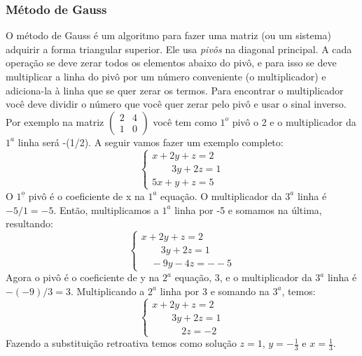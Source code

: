   \subsubsection*{Método de Gauss}
  O método de Gauss é um algoritmo para fazer uma matriz (ou um sistema) adquirir a forma triangular superior. Ele usa \textit{pivôs} na diagonal principal. A cada operação se deve zerar todos os elementos abaixo do pivô, e para isso se deve multiplicar a linha do pivô por um número conveniente (o multiplicador) e adiciona-la à linha que se quer zerar os termos. Para encontrar o multiplicador você deve dividir o número que você quer zerar pelo pivô e usar o sinal inverso.\\
  Por exemplo na matriz $\left(\begin{smallmatrix}2&4\\1&0\end{smallmatrix}\right)$ você tem como $1^o$ pivô o 2 e o multiplicador da $1^a$ linha será -(1/2). A seguir vamos fazer um exemplo completo:
  \[\left\{
    \begin{array}{l}
    x+2y+z=2\\
    \qquad 3y+2z=1\\
    5x+y+z=5
    \end{array}\right.\]
    O $ 1^{\underline{o}} $ pivô é o coeficiente de x na $1^a$ equação. O multiplicador da $3^a$ linha é $-5/1=-5$.
Então, multiplicamos a $1^a$ linha por -5 e somamos na última, resultando:
    \[\left\{
    \begin{array}{l}
    x+2y+z=2\\
    \qquad 3y+2z=1\\
    \quad -9y-4z =--5  
    \end{array}\right.\]
    Agora o pivô é o coeficiente de y na $2^a$ equação, 3, e o multiplicador da $3^a$ linha é $-(-9)/3=3$.
Multiplicando a $2^a$ linha por 3 e somando na $3^a$, temos:
    \[\left\{
    \begin{array}{l}
    x+2y+z=2\\
    \qquad 3y+2z=1\\
    \qquad\quad 2z =-2  
    \end{array}\right.\]
    Fazendo a substituição retroativa temos como solução $z=1$, $y= -\frac{1}{3}$ e $x=\frac{1}{3}$.
    
